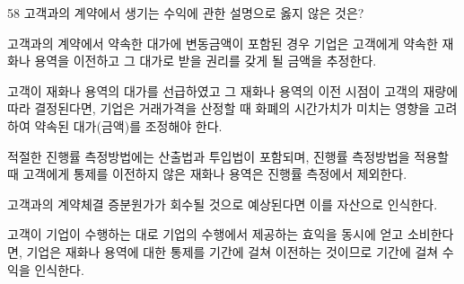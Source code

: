 \begin{question}{58}
고객과의 계약에서 생기는 수익에 관한 설명으로 옳지 않은 것은?
\begin{choices}
  \item 고객과의 계약에서 약속한 대가에 변동금액이 포함된 경우 기업은 고객에게 약속한 재화나 용역을 이전하고 그 대가로 받을 권리를 갖게 될 금액을 추정한다.
  \item 고객이 재화나 용역의 대가를 선급하였고 그 재화나 용역의 이전 시점이 고객의 재량에 따라 결정된다면, 기업은 거래가격을 산정할 때 화폐의 시간가치가 미치는 영향을 고려하여 약속된 대가(금액)를 조정해야 한다.
  \item 적절한 진행률 측정방법에는 산출법과 투입법이 포함되며, 진행률 측정방법을 적용할 때 고객에게 통제를 이전하지 않은 재화나 용역은 진행률 측정에서 제외한다.
  \item 고객과의 계약체결 증분원가가 회수될 것으로 예상된다면 이를 자산으로 인식한다.
  \item 고객이 기업이 수행하는 대로 기업의 수행에서 제공하는 효익을 동시에 얻고 소비한다면, 기업은 재화나 용역에 대한 통제를 기간에 걸쳐 이전하는 것이므로 기간에 걸쳐 수익을 인식한다.
\end{choices}
\end{question}
